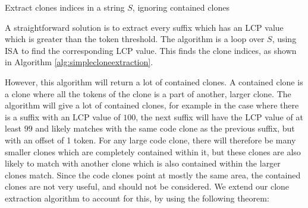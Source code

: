 \begin{algorithm}[t]
  \SetAlgoLined\DontPrintSemicolon

  \vspace{0.5cm}
  \caption{Extract clones indices in a string $S$, ignoring contained clones}
  \label{alg:cloneextraction}
\end{algorithm}

A straightforward solution is to extract every suffix which has an LCP value which is
greater than the token threshold. The algorithm is a loop over $S$, using ISA to find the
corresponding LCP value. This finds the clone indices, as shown in Algorithm
\ref{alg:simplecloneextraction}.


However, this algorithm will return a lot of contained clones. A contained clone is a
clone where all the tokens of the clone is a part of another, larger clone. The algorithm
will give a lot of contained clones, for example in the case where there is a suffix with
an LCP value of $100$, the next suffix will have the LCP value of at least $99$ and likely
matches with the same code clone as the previous suffix, but with an offset of 1 token.
For any large code clone, there will therefore be many smaller clones which are completely
contained within it, but these clones are also likely to match with another clone which is
also contained within the larger clones match. Since the code clones point at mostly the
same area, the contained clones are not very useful, and should not be considered. We
extend our clone extraction algorithm to account for this, by using the following theorem:

